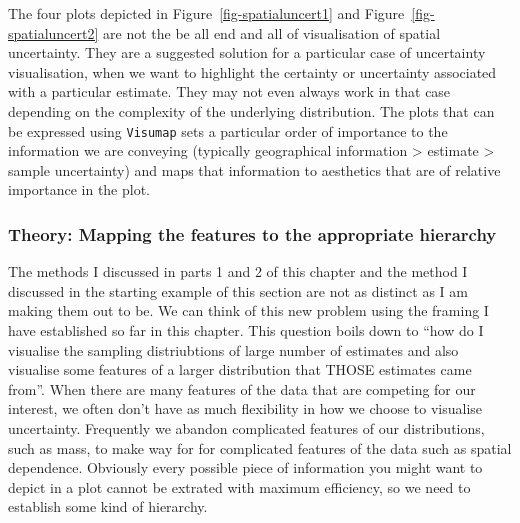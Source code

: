 \documentclass[
  letterpaper,
  DIV=11,
  numbers=noendperiod]{scrartcl}
\begin{document}
The four plots depicted in Figure~\ref{fig-spatialuncert1} and
Figure~\ref{fig-spatialuncert2} are not the be all end and all of
visualisation of spatial uncertainty. They are a suggested solution for
a particular case of uncertainty visualisation, when we want to
highlight the certainty or uncertainty associated with a particular
estimate. They may not even always work in that case depending on the
complexity of the underlying distribution. The plots that can be
expressed using \texttt{Visumap} sets a particular order of importance
to the information we are conveying (typically geographical information
\textgreater{} estimate \textgreater{} sample uncertainty) and maps that
information to aesthetics that are of relative importance in the plot.

\hypertarget{theory-mapping-the-features-to-the-appropriate-hierarchy}{%
\subsubsection{Theory: Mapping the features to the appropriate
hierarchy}\label{theory-mapping-the-features-to-the-appropriate-hierarchy}}

The methods I discussed in parts 1 and 2 of this chapter and the method
I discussed in the starting example of this section are not as distinct
as I am making them out to be. We can think of this new problem using
the framing I have established so far in this chapter. This question
boils down to ``how do I visualise the sampling distriubtions of large
number of estimates and also visualise some features of a larger
distribution that THOSE estimates came from''. When there are many
features of the data that are competing for our interest, we often don't
have as much flexibility in how we choose to visualise uncertainty.
Frequently we abandon complicated features of our distributions, such as
mass, to make way for for complicated features of the data such as
spatial dependence. Obviously every possible piece of information you
might want to depict in a plot cannot be extrated with maximum
efficiency, so we need to establish some kind of hierarchy.
\end{document}
